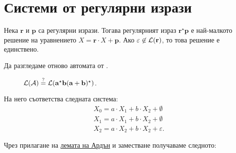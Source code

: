 \section{Системи от регулярни изрази}

\begin{important}
  \begin{lemma}[Ардън]
    \label{lem:regular:system:arden}
    Нека $\mathbf{r}$  и $\mathbf{p}$ са регулярни изрази.
    Тогава регулярният израз $\mathbf{r}^\star \mathbf{p}$ е най-малкото решение на уравнението $X = \mathbf{r} \cdot X + \mathbf{p}$.
    Ако $\varepsilon  \not \in \mathcal{L}(\mathbf{r})$, то това решение е единствено.
  \end{lemma}
\end{important}

Да разгледаме отново автомата от .

\begin{figure}[H]
  \begin{center}
  \end{center}
  \caption{$\mathcal{L}(\mathcal{A}) \stackrel{?}{=} \mathcal{L}(\mathbf{a^\star b(a+b)^\star})$.}
\end{figure}

На него съответства следната система:
\begin{align*}
  & X_0 = a \cdot X_1 + b \cdot X_2 + \emptyset\\
  & X_1 = a \cdot X_1 + b \cdot X_2 + \emptyset\\
  & X_2 = a \cdot X_2 + b \cdot X_2 + \varepsilon.
\end{align*}

Чрез прилагане на \hyperref[lem:regular:system:arden]{лемата на Ардън} и заместване получаваме следното:

